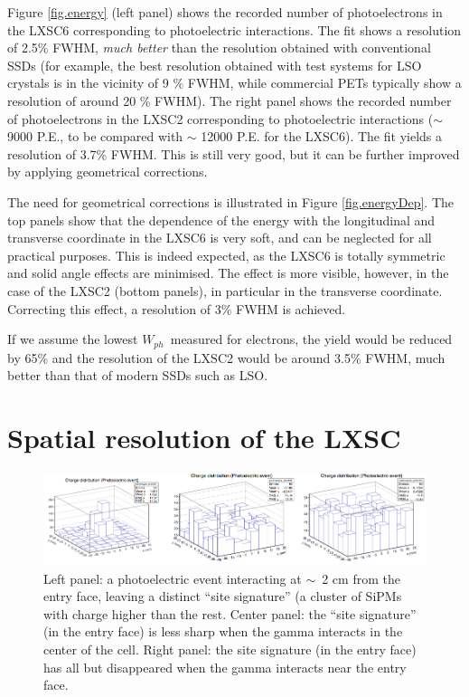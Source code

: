 \documentclass{JINST}
\begin{document}
Figure \ref{fig.energy} (left panel) shows the recorded number of photoelectrons in the LXSC6 corresponding to photoelectric interactions. The fit shows a resolution of 2.5\% FWHM, {\em much better} than the resolution obtained with conventional SSDs (for example, the best resolution obtained with test systems for LSO crystals is in the vicinity of 9 \% FWHM, while commercial PETs typically show a resolution of around 20 \% FWHM). The right panel shows the recorded number of photoelectrons in the LXSC2 corresponding to photoelectric interactions ($\sim$ 9000 P.E., to be compared with $\sim$ 12000 P.E. for the LXSC6). The  fit yields a resolution of 3.7\% FWHM. This is still very good, but it can be further improved by applying geometrical corrections.

The need for geometrical corrections is illustrated in Figure \ref{fig.energyDep}. The top panels show that the dependence of the energy with the longitudinal and transverse coordinate in the LXSC6 is very soft, and can be neglected for all practical purposes. This is indeed expected, as the LXSC6 is totally symmetric and solid angle effects are minimised. The effect is more visible, however, in the case of the LXSC2 (bottom panels), in particular in the transverse coordinate. Correcting this effect, a resolution of 3\% FWHM is achieved. 

If we assume the lowest $W_{ph}$~measured for electrons, the yield would be reduced by 65\% and the resolution of the LXSC2 would be around 3.5\% FWHM, much better than that of modern SSDs such as LSO. 



\section{Spatial resolution of the LXSC}

\begin{figure}[!htb]
	\centering
	\includegraphics[scale=0.4]{img/zEvents.png}
	\caption{\label{fig.ze}  Left panel: a photoelectric event interacting at $\sim$~2 cm from the entry face, leaving a distinct ``site signature'' (a cluster of SiPMs with charge higher than the rest. Center panel: the ``site signature'' (in the entry face) is less sharp when the gamma interacts in the center of the cell. Right panel: the site signature (in the entry face) has all but disappeared when the gamma interacts near the entry face.}
\end{figure}
\end{document}

